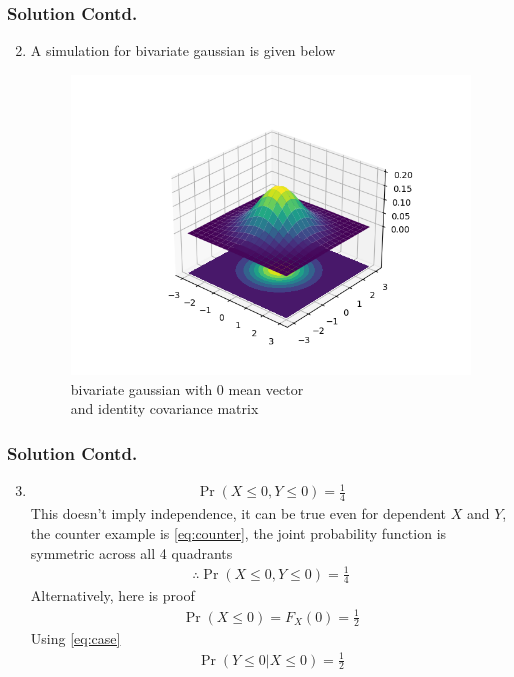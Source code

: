 \documentclass{beamer}
\providecommand{\pr}[1]{\ensuremath{\Pr\left(#1\right)}}
\begin{document}
\begin{frame}
 \frametitle{Solution Contd.}
\begin{enumerate}
\setcounter{enumi}{1}
\item
A simulation for bivariate gaussian is given below
\begin{figure}[H]
\centering
\includegraphics[width=0.75\linewidth]{figure/plot}
\caption{bivariate gaussian with 0 mean vector\\ and identity covariance matrix}
\label{plot}
\end{figure}
\end{enumerate}
\end{frame}

\begin{frame}
 \frametitle{Solution Contd.}
\begin{enumerate}
\setcounter{enumi}{2}
\item
\begin{align}
\pr{X\le 0, Y\le0}=\frac{1}{4}
\end{align}
This doesn't imply independence, it can be true even for dependent $X$ and $Y$, the counter example is \eqref{eq:counter}, the joint probability function is symmetric across all 4 quadrants
\begin{align}
\therefore \pr{X\le 0, Y\le0}=\frac{1}{4}
\end{align}
Alternatively, here is proof 
\begin{align}
\pr{X\le 0}=F_X(0)=\frac{1}{2} \label{eq:pr1}
\end{align}
Using \eqref{eq:case}
\begin{align}
\pr{Y\le 0|X\le 0}=\frac{1}{2} \label{eq:pr2}
\end{align}
\end{enumerate}
\end{frame}
\end{document}

